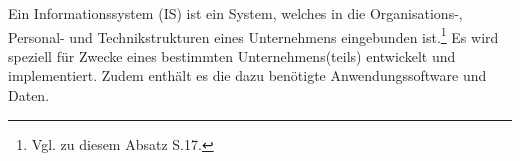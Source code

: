 Ein Informationssystem (IS) ist ein System, welches in die Organisations-, Personal- und Technikstrukturen eines Unternehmens eingebunden ist.\footnote{Vgl. zu diesem Absatz \cite{Laudon.2009} S.17.} 
Es wird speziell für Zwecke eines bestimmten Unternehmens(teils) entwickelt und implementiert.
Zudem enthält es die dazu benötigte Anwendungssoftware und Daten.